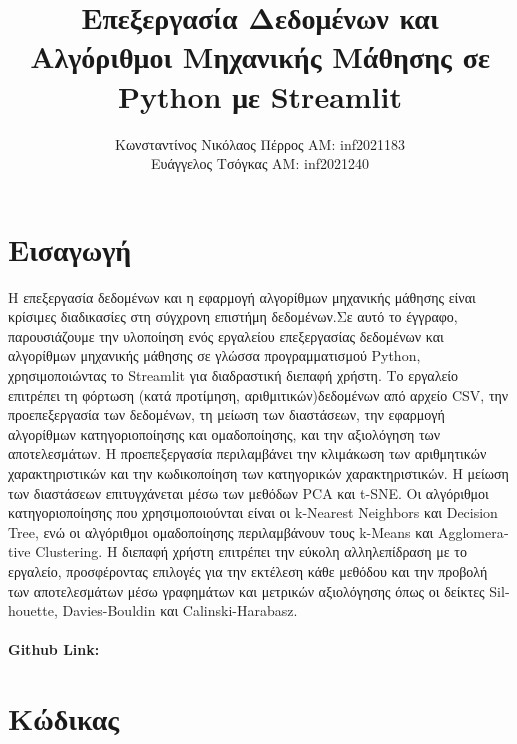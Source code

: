 \documentclass{article}
\begin{document}
\title{Επεξεργασία Δεδομένων και Αλγόριθμοι Μηχανικής Μάθησης σε \textlatin{Python} με \textlatin{Streamlit}}

\author{Κωνσταντίνος Νικόλαος Πέρρος  AM: \textlatin{inf}2021183\\
    Ευάγγελος Τσόγκας  AM: \textlatin{inf}2021240}

\maketitle


\section{Εισαγωγή}
Η επεξεργασία δεδομένων και η εφαρμογή αλγορίθμων μηχανικής μάθησης είναι κρίσιμες διαδικασίες στη σύγχρονη επιστήμη δεδομένων.Σε αυτό το έγγραφο, παρουσιάζουμε την υλοποίηση ενός εργαλείου επεξεργασίας δεδομένων και αλγορίθμων μηχανικής μάθησης σε γλώσσα προγραμματισμού  \textlatin{Python}, χρησιμοποιώντας το \textlatin{Streamlit} για διαδραστική διεπαφή χρήστη. Το εργαλείο επιτρέπει τη φόρτωση (κατά προτίμηση, αριθμιτικών)δεδομένων από αρχείο \textlatin{CSV}, την προεπεξεργασία των δεδομένων, τη μείωση των διαστάσεων, την εφαρμογή αλγορίθμων κατηγοριοποίησης και ομαδοποίησης, και την αξιολόγηση των αποτελεσμάτων. Η προεπεξεργασία περιλαμβάνει την κλιμάκωση των αριθμητικών χαρακτηριστικών και την κωδικοποίηση των κατηγορικών χαρακτηριστικών. Η μείωση των διαστάσεων επιτυγχάνεται μέσω των μεθόδων \textlatin{PCA} και \textlatin{t-SNE}. Οι αλγόριθμοι κατηγοριοποίησης που χρησιμοποιούνται είναι οι \textlatin{k-Nearest Neighbors} και \textlatin{Decision Tree}, ενώ οι αλγόριθμοι ομαδοποίησης περιλαμβάνουν τους \textlatin{k-Means} και \textlatin{Agglomerative Clustering}. Η διεπαφή χρήστη επιτρέπει την εύκολη αλληλεπίδραση με το εργαλείο, προσφέροντας επιλογές για την εκτέλεση κάθε μεθόδου και την προβολή των αποτελεσμάτων μέσω γραφημάτων και μετρικών αξιολόγησης όπως οι δείκτες \textlatin{Silhouette}, \textlatin{Davies-Bouldin} και \textlatin{Calinski-Harabasz}. 
\paragraph{\textlatin{Github Link:}}\textlatin{   } 


\newpage\section{Κώδικας}
\end{document}
